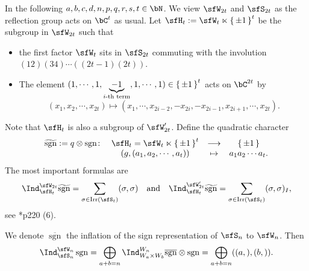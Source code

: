 \documentclass[12pt,a4paper]{amsart}
\newcommand{\sgn}{\operatorname{sgn}}
\numberwithin{equation}{section}
\theoremstyle{remark}
\def\Irr{\mathrm{Irr}}
\def\AND{\quad \text{and} \quad}
\def\hsgn{\widetilde{\mathrm{sgn}}}
\def\bsgn{\overline{\sgn}}
\begin{document}
In the following $a,b,c,d,n,p,q,r,s,t\in \bN$.
We view $\sfW_{2t}$ and $\sfS_{2t}$ as the reflection group acts on $\bC^{t}$ as usual. Let
$\sfH_{t} := \sfW_t\ltimes \set{\pm 1}^t$ be the subgroup in $\sfW_{2t}$ such that
\begin{itemize}
  \item the first factor $\sfW_{t}$ sits in $\sfS_{2t}$ commuting with the involution
        $(12)(34)\cdots ((2t-1)(2t))$.
  \item The element $(1,\cdots,1, \underbrace{-1}_{i\text{-th
        term}}, 1, \cdots, 1)\in \set{\pm 1}^{t}$ acts on $\bC^{2t}$ by
        \[
        (x_{1},x_{2},\cdots, x_{2t} ) \mapsto (x_{1},\cdots, x_{2i-2}, -x_{2i},-x_{2i-1},x_{2i+1},\cdots, x_{2t}).
        \]
\end{itemize}
Note that $\sfH_{t}$ is also a subgroup of $\sfW'_{2t}$.
Define the quadratic character
\[
  \begin{array}{rccc}
    \hsgn := q\otimes \sgn\colon & \sfH_{t}=  \sfW_{t}\ltimes \set{\pm 1}^{t}& \longrightarrow & \set{\pm 1}\\
    & (g,(a_{1},a_{2},\cdots, a_{t})) & \mapsto & a_{1}a_{2}\cdots a_{t}.
  \end{array}
\]
The most important formulas are
\begin{equation}\label{eq:CC.C}
  \Ind_{\sfH_{t}}^{\sfW_{2t}} \hsgn = \sum_{\sigma\in \Irr(\sfS_{t})} (\sigma,\sigma)
  \AND
  \Ind_{\sfH_{t}}^{\sfW'_{2t}} \hsgn = \sum_{\sigma\in \Irr(\sfS_{t})} (\sigma,\sigma)_{I},
\end{equation}
see \cite{Mc}*{p220 (6)}.

We denote $\bsgn$ the inflation of the sign
representation of $\sfS_{n}$ to $\sfW_{n}$.
Then
\[
  \Ind_{\sfS_{n}}^{\sfW_{n}}\sgn
  = \bigoplus_{a+b=n}\Ind_{W_{a}\times W_{b}}^{W_{n}} \bsgn\otimes \sgn
  =\bigoplus_{a+b=n} ((a,),(b,)) .
\]

\end{document}

